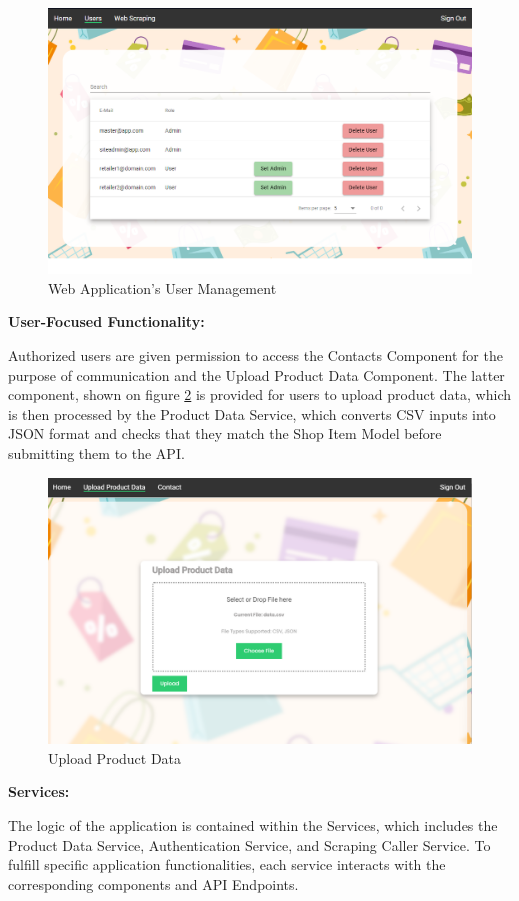 \begin{figure}[H]
	\centering
	\includegraphics[width=0.8\linewidth]{img/users_ss.png}
	\caption{Web Application's User Management}
	\label{fig:umgmt}
\end{figure}

\noindent\textbf{User-Focused Functionality:}

Authorized users are given permission to access the Contacts Component for the purpose of communication and the Upload Product Data Component. The latter component, shown on figure \ref{fig:uploaddata} is provided for users to upload product data, which is then processed by the Product Data Service, which converts CSV inputs into JSON format and checks that they match the Shop Item Model before submitting them to the API.

\begin{figure}[H]
	\centering
	\includegraphics[width=0.65\linewidth]{img/product_data_ss.png}
	\caption{Upload Product Data}
	\label{fig:uploaddata}
\end{figure}

\noindent\textbf{Services:} 

The logic of the application is contained within the Services, which includes the Product Data Service, Authentication Service, and Scraping Caller Service. To fulfill specific application functionalities, each service interacts with the corresponding components and API Endpoints.

